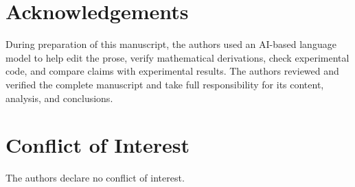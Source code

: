 \documentclass[11pt]{article}
\begin{document}
\section*{Acknowledgements}

During preparation of this manuscript, the authors used an AI-based language model to help edit the prose, verify mathematical derivations, check experimental code, and compare claims with experimental results. The authors reviewed and verified the complete manuscript and take full responsibility for its content, analysis, and conclusions.

\section*{Conflict of Interest}

The authors declare no conflict of interest.



\end{document}
